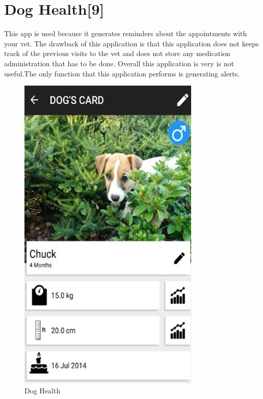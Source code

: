 \section{Dog Health[9]}
This app is used because it generates  reminders about the appointments with your vet. The drawback of this application is that this application does not keeps track of the previous visits to the vet  and does not store any medication administration that has to be done. Overall this application is very is not useful.The only function that  this application performs is generating alerts.
\begin{figure}[H]
  \centering
    \includegraphics[scale=0.3]{25Doghealth}
     \caption{Dog Health}
\end{figure}
